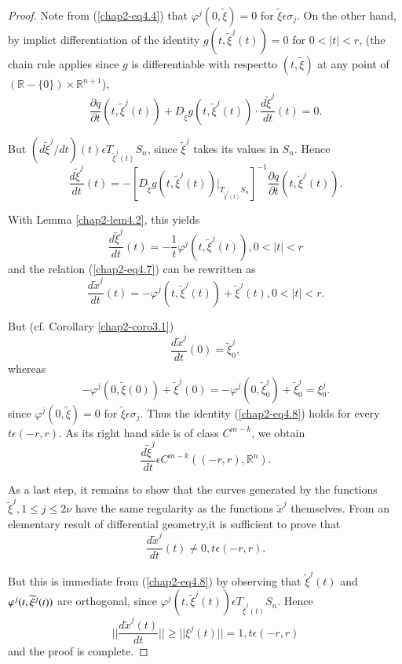 \begin{proof}
Note from (\ref{chap2-eq4.4}) that $\varphi^{j}(0, \widetilde{\xi}) =
0$ for $\widetilde{\xi} \epsilon \sigma_{j}$. On the other hand, by
implict differentiation of the identity $g(t, \widetilde{\xi}^{j}(t))
= 0$ for $0 < |t| < r$, (the chain rule applies since $g$ is
differentiable with respect\pageoriginale to $(t, \widetilde{\xi})$ at
any point of $(\mathbb{R} - \{0\}) \times \mathbb{R}^{n+1}$),
$$
\frac{\partial q}{\partial t} (t, \widetilde{\xi}^{j}(t)) +
D_{\widetilde{\xi}}g(t, \widetilde{\xi}^{j}(t)) \cdot
\frac{d\widetilde{\xi}^{j}}{dt} (t) = 0.
$$

But $(d\widetilde{\xi}^{j} / dt)(t) \epsilon
T_{\widetilde{\xi}^{j}(t)}S_{n}$, since $\widetilde{\xi}^{j}$ takes
its values in $S_{n}$. Hence
$$
\frac{d\widetilde{\xi}^{j}}{dt} (t) = -\left[D_{\widetilde{\xi}}g(t,
  \widetilde{\xi}^{j} (t))
  |_{T_{\widetilde{\xi}^{j}(t)}S_{n}}\right]^{-1} \frac{\partial
  q}{\partial t} (t, \widetilde{\xi}^{j} (t)).
$$

With Lemma \ref{chap2-lem4.2}, this yields
$$
\frac{d\widetilde{\xi}^{j}}{dt} (t) = -\frac{1}{t} \varphi^{j} (t,
\widetilde{\xi}^{j}(t)), 0 < |t| < r
$$  
and the relation (\ref{chap2-eq4.7}) can be rewritten as
\begin{equation*} 
\frac{d\widetilde{x}^{j}}{dt} (t) = -\varphi^{j}(t,
\widetilde{\xi}^{j}(t)) + \widetilde{\xi}^{j}(t), 0 < |t| < r.\tag{4.8}\label{chap2-eq4.8}  
\end{equation*}

But (cf. Corollary \ref{chap2-coro3.1})
$$
\frac{d\widetilde{x}^{j}}{dt} (0) = \widetilde{\xi}_{0}^{j},
$$
whereas
$$
-\varphi^{j}(0, \widetilde{\xi}(0)) + \widetilde{\xi}^{j}(0) =
-\varphi^{j}(0, \widetilde{\xi}_{0}^{j}) + \widetilde{\xi}_{0}^{j} = \xi_{0}^{j}.
$$
since $\varphi^{j}(0, \widetilde{\xi}) = 0$ for $\widetilde{\xi}
\epsilon \sigma_{j}$. Thus the identity (\ref{chap2-eq4.8}) holds for
every $t \epsilon (-r, r)$. As its right hand side is of class
$C^{m-k}$, we obtain 
$$
\frac{d\widetilde{\xi}^{j}}{dt} \epsilon C^{m-k} ((-r, r), \mathbb{R}^{n}).
$$

As a last step, it remains to show that the curves generated by the
functions $\widetilde{\xi}^{j}, 1 \leq j \leq 2\nu$ have the same
regularity as the functions $\widetilde{x}^{j}$ themselves. From an
elementary result of differential geometry,\pageoriginale it is
sufficient to prove that
$$
\frac{d\widetilde{x}^{j}}{dt}(t) \neq 0, t \epsilon (-r, r).
$$

But this is immediate from (\ref{chap2-eq4.8}) by observing that
$\widetilde{\xi}^{j}(t)$ and $\varphi^{j} (t,\break \widetilde{\xi}^{j}(t))$
are orthogonal, since $\varphi^{j}(t, \widetilde{\xi}^{j}(t)) \epsilon
T_{\widetilde{\xi}^{j}(t)} S_{n}$. Hence
$$
||\frac{d\widetilde{x}^{j}(t)}{dt}|| \geq ||\xi^{j}(t)|| = 1, t
\epsilon (-r, r)
$$
and the proof is complete.
\end{proof}

